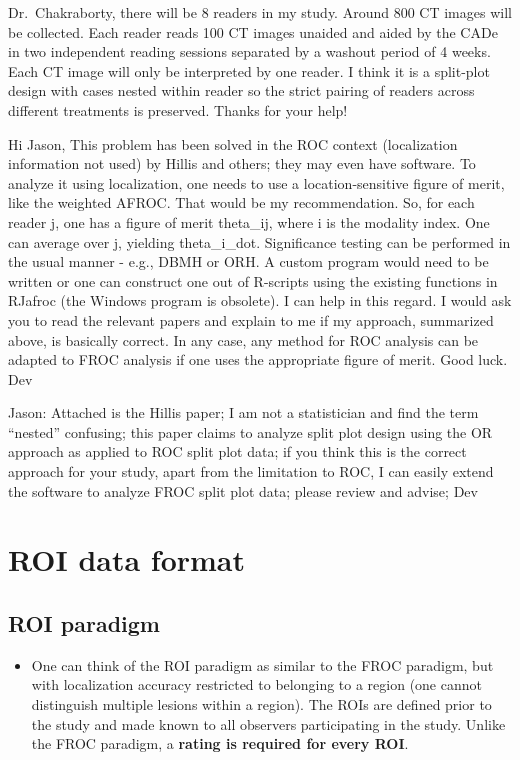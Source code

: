 \documentclass[]{book}
\providecommand{\tightlist}{%
  \setlength{\itemsep}{0pt}\setlength{\parskip}{0pt}}
\begin{document}
Dr.~Chakraborty, there will be 8 readers in my study. Around 800 CT images will be collected. Each reader reads 100 CT images unaided and aided by the CADe in two independent reading sessions separated by a washout period of 4 weeks. Each CT image will only be interpreted by one reader. I think it is a split-plot design with cases nested within reader so the strict pairing of readers across different treatments is preserved. Thanks for your help!

Hi Jason,
This problem has been solved in the ROC context (localization information not used) by Hillis and others; they may even have software. To analyze it using localization, one needs to use a location-sensitive figure of merit, like the weighted AFROC. That would be my recommendation. So, for each reader j, one has a figure of merit theta\_ij, where i is the modality index. One can average over j, yielding theta\_i\_dot. Significance testing can be performed in the usual manner - e.g., DBMH or ORH. A custom program would need to be written or one can construct one out of R-scripts using the existing functions in RJafroc (the Windows program is obsolete). I can help in this regard. I would ask you to read the relevant papers and explain to me if my approach, summarized above, is basically correct. In any case, any method for ROC analysis can be adapted to FROC analysis if one uses the appropriate figure of merit. Good luck. Dev

Jason: Attached is the Hillis paper; I am not a statistician and find the term ``nested'' confusing; this paper claims to analyze split plot design using the OR approach as applied to ROC split plot data; if you think this is the correct approach for your study, apart from the limitation to ROC, I can easily extend the software to analyze FROC split plot data; please review and advise; Dev

\hypertarget{roidataformat}{%
\chapter{ROI data format}\label{roidataformat}}

\hypertarget{roi-paradigm}{%
\section{ROI paradigm}\label{roi-paradigm}}

\begin{itemize}
\tightlist
\item
  One can think of the ROI paradigm as similar to the FROC paradigm, but with localization accuracy restricted to belonging to a region (one cannot distinguish multiple lesions within a region). The ROIs are defined prior to the study and made known to all observers participating in the study. Unlike the FROC paradigm, a \textbf{rating is required for every ROI}.
\end{itemize}


\end{document}
